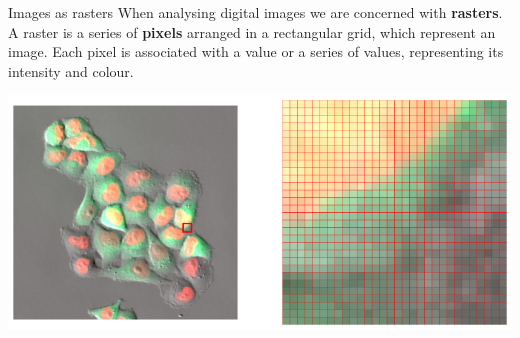 \documentclass[9pt, aspectratio=169]{beamer}
\begin{document}
\begin{frame}
{Images as rasters}
When analysing digital images we are concerned with \textbf{rasters}.\\
A raster is a series of \textbf{pixels} arranged in a rectangular grid, which represent an image. Each pixel is associated with a value or a series of values, representing its intensity and colour.
\begin{center}
    \includegraphics[width=.8\textwidth]{raster.png}
\end{center}
\end {frame}
\end{document}
